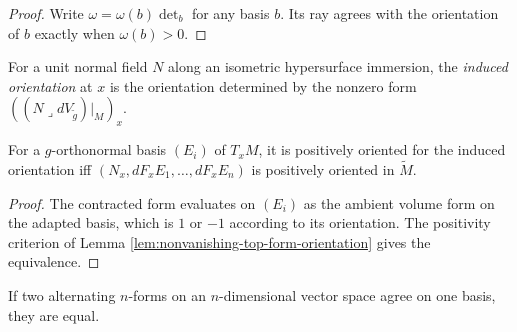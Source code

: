 \begin{proof}

\sketch Write $\omega=\omega(b)\det_b$ for any basis $b$. Its ray agrees with the orientation of $b$ exactly when $\omega(b)>0$.
\end{proof}

\begin{definition}
\label{def:induced-orientation}




For a unit normal field $N$ along an isometric hypersurface immersion, the \emph{induced orientation} at $x$ is the orientation determined by the nonzero form $((N\lrcorner dV_{\widetilde g})|_M)_x$.
\end{definition}

\begin{lemma}
\label{lem:induced-orientation-characterization}





For a $g$-orthonormal basis $(E_i)$ of $T_xM$, it is positively oriented for the induced orientation iff $(N_x,dF_xE_1,\ldots,dF_xE_n)$ is positively oriented in $\widetilde M$.
\end{lemma}

\begin{proof}

\sketch The contracted form evaluates on $(E_i)$ as the ambient volume form on the adapted basis, which is $1$ or $-1$ according to its orientation. The positivity criterion of Lemma \ref{lem:nonvanishing-top-form-orientation} gives the equivalence.
\end{proof}

\begin{lemma}
\label{lem:top-form-eq-of-basis}




If two alternating $n$-forms on an $n$-dimensional vector space agree on one basis, they are equal.
\end{lemma}


